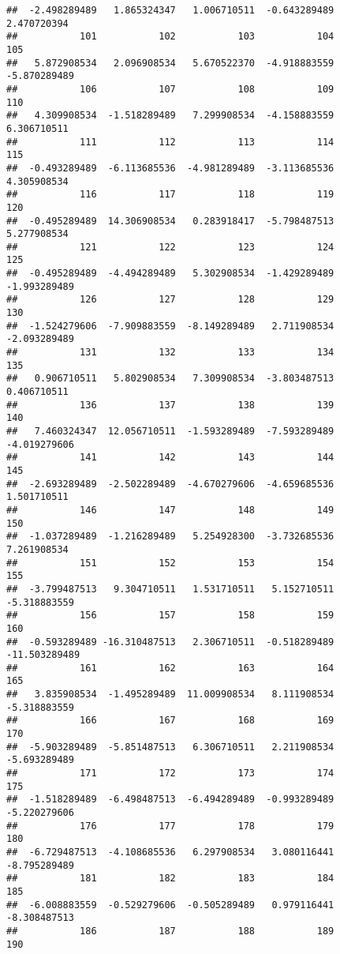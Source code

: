 \documentclass[
]{article}
\begin{document}
\begin{verbatim}
##  -2.498289489   1.865324347   1.006710511  -0.643289489   2.470720394 
##           101           102           103           104           105 
##   5.872908534   2.096908534   5.670522370  -4.918883559  -5.870289489 
##           106           107           108           109           110 
##   4.309908534  -1.518289489   7.299908534  -4.158883559   6.306710511 
##           111           112           113           114           115 
##  -0.493289489  -6.113685536  -4.981289489  -3.113685536   4.305908534 
##           116           117           118           119           120 
##  -0.495289489  14.306908534   0.283918417  -5.798487513   5.277908534 
##           121           122           123           124           125 
##  -0.495289489  -4.494289489   5.302908534  -1.429289489  -1.993289489 
##           126           127           128           129           130 
##  -1.524279606  -7.909883559  -8.149289489   2.711908534  -2.093289489 
##           131           132           133           134           135 
##   0.906710511   5.802908534   7.309908534  -3.803487513   0.406710511 
##           136           137           138           139           140 
##   7.460324347  12.056710511  -1.593289489  -7.593289489  -4.019279606 
##           141           142           143           144           145 
##  -2.693289489  -2.502289489  -4.670279606  -4.659685536   1.501710511 
##           146           147           148           149           150 
##  -1.037289489  -1.216289489   5.254928300  -3.732685536   7.261908534 
##           151           152           153           154           155 
##  -3.799487513   9.304710511   1.531710511   5.152710511  -5.318883559 
##           156           157           158           159           160 
##  -0.593289489 -16.310487513   2.306710511  -0.518289489 -11.503289489 
##           161           162           163           164           165 
##   3.835908534  -1.495289489  11.009908534   8.111908534  -5.318883559 
##           166           167           168           169           170 
##  -5.903289489  -5.851487513   6.306710511   2.211908534  -5.693289489 
##           171           172           173           174           175 
##  -1.518289489  -6.498487513  -6.494289489  -0.993289489  -5.220279606 
##           176           177           178           179           180 
##  -6.729487513  -4.108685536   6.297908534   3.080116441  -8.795289489 
##           181           182           183           184           185 
##  -6.008883559  -0.529279606  -0.505289489   0.979116441  -8.308487513 
##           186           187           188           189           190 

\end{verbatim}
\end{document}
